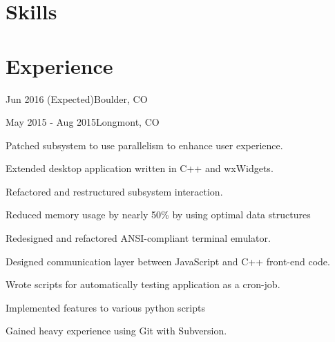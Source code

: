 \documentclass[letterpaper]{deedy-resume}
\begin{document}
\begin{minipage}[t]{0.66\textwidth}

\section{Skills}





\section{Experience}

     {Jun 2016 (Expected)}{Boulder, CO}{}

     {May 2015 - Aug 2015}{Longmont, CO}{%
        \begin{tightitemize}
        \item Patched subsystem to use parallelism to enhance user experience.
        \item Extended desktop application written in C++ and wxWidgets.
        \item Refactored and restructured subsystem interaction.
        \item Reduced memory usage by nearly 50\% by using optimal data structures
        \item Redesigned and refactored ANSI-compliant terminal emulator.
        \item Designed communication layer between JavaScript and C++ front-end code.
        \item Wrote scripts for automatically testing application as a cron-job.
        \item Implemented features to various python scripts
        \item Gained heavy experience using Git with Subversion.
        \end{tightitemize}
}


\end{minipage}
\end{document}
